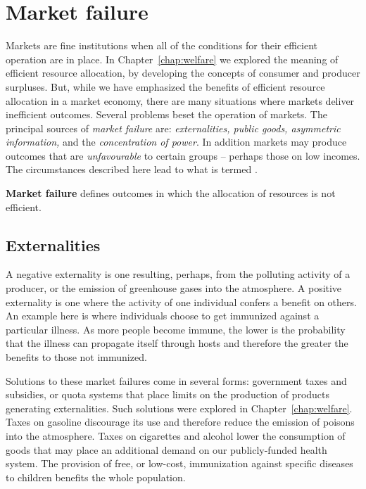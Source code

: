 \section{Market failure}\label{sec:ch14sec1}

Markets are fine institutions when all of the conditions for their efficient operation are in place. In Chapter~\ref{chap:welfare} we explored the meaning of efficient resource allocation, by developing the concepts of consumer and producer surpluses. But, while we have emphasized the benefits of efficient resource allocation in a market economy, there are many situations where markets deliver inefficient outcomes. Several problems beset the operation of markets. The principal sources of \textit{market failure} are: \textit{externalities, public goods, asymmetric information,} and the \textit{concentration of power}. In addition markets may produce outcomes that are \textit{unfavourable} to certain groups -- perhaps those on low incomes. The circumstances described here lead to what is termed .

\begin{DefBox}
\textbf{Market failure} defines outcomes in which the allocation of resources is not efficient.  
\end{DefBox}

\subsection*{Externalities}

A negative externality is one resulting, perhaps, from the polluting activity of a producer, or the emission of greenhouse gases into the atmosphere. A positive externality is one where the activity of one individual confers a benefit on others. An example here is where individuals choose to get immunized against a particular illness. As more people become immune, the lower is the probability that the illness can propagate itself through hosts and therefore the greater the benefits to those not immunized. 

Solutions to these market failures come in several forms: government taxes and subsidies, or quota systems that place limits on the production of products generating externalities. Such solutions were explored in Chapter~\ref{chap:welfare}. Taxes on gasoline discourage its use and therefore reduce the emission of poisons into the atmosphere. Taxes on cigarettes and alcohol lower the consumption of goods that may place an additional demand on our publicly-funded health system. The provision of free, or low-cost, immunization against specific diseases to children benefits the whole population.

